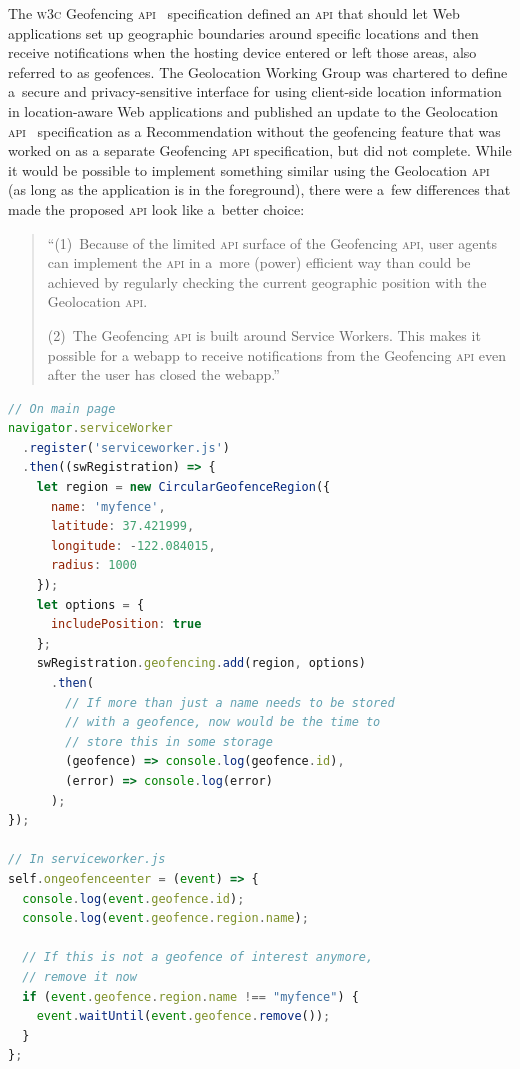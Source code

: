 \documentclass[sigconf,hyphens]{acmart}
\begin{document}
The \textsc{w3c} Geofencing \textsc{api}~\cite{kruisselbrink2017geofencing} specification
defined an \textsc{api} that should let Web applications set up geographic boundaries
around specific locations and then receive notifications when the hosting device
entered or left those areas, also referred to as geofences.
The Geolocation Working Group was chartered to define a~secure and privacy-sensitive interface
for using client-side location information in location-aware Web applications
and published an update to the Geolocation \textsc{api}~\cite{popescu2016geolocation}
specification as a Recommendation without the geofencing feature
that was worked on as a separate Geofencing \textsc{api} specification, but did not complete.
While it would be possible to implement something similar using the Geolocation \textsc{api}
(as long as the application is in the foreground),
there were a~few differences that made the proposed \textsc{api} look like a~better choice:

\begin{quote}
``(1)~Because of the limited \textsc{api} surface of the Geofencing \textsc{api},
user agents can implement the \textsc{api} in a~more (power) efficient way
than could be achieved by regularly checking the current geographic position with the Geolocation \textsc{api}.

(2)~The Geofencing \textsc{api} is built around Service Workers.
This makes it possible for a webapp to receive notifications from the Geofencing \textsc{api}
even after the user has closed the webapp.''	
\end{quote}

\begin{lstlisting}[caption={Geofencing \textsc{api} (conceived example)},
  label=code:geofence, language=JavaScript, float=h] 
// On main page
navigator.serviceWorker
  .register('serviceworker.js')
  .then((swRegistration) => {
    let region = new CircularGeofenceRegion({
      name: 'myfence',
      latitude: 37.421999,
      longitude: -122.084015,
      radius: 1000
    });
    let options = {
      includePosition: true
    };
    swRegistration.geofencing.add(region, options)
      .then(
        // If more than just a name needs to be stored
        // with a geofence, now would be the time to
        // store this in some storage
        (geofence) => console.log(geofence.id),
        (error) => console.log(error)
      );
});

// In serviceworker.js
self.ongeofenceenter = (event) => {
  console.log(event.geofence.id);
  console.log(event.geofence.region.name);

  // If this is not a geofence of interest anymore,
  // remove it now
  if (event.geofence.region.name !== "myfence") {
    event.waitUntil(event.geofence.remove());
  }
};
\end{lstlisting}
\end{document}
